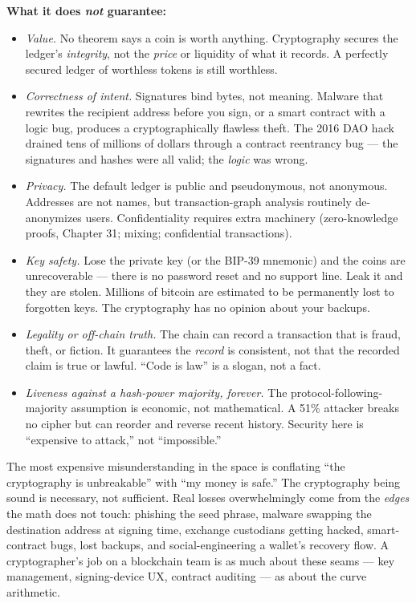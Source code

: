 \textbf{What it does \emph{not} guarantee:}

\begin{itemize}
  \item \emph{Value.} No theorem says a coin is worth anything. Cryptography secures the ledger's \emph{integrity}, not the \emph{price} or liquidity of what it records. A perfectly secured ledger of worthless tokens is still worthless.
  \item \emph{Correctness of intent.} Signatures bind bytes, not meaning. Malware that rewrites the recipient address before you sign, or a smart contract with a logic bug, produces a cryptographically flawless theft. The 2016 DAO hack drained tens of millions of dollars through a contract reentrancy bug --- the signatures and hashes were all valid; the \emph{logic} was wrong.
  \item \emph{Privacy.} The default ledger is public and pseudonymous, not anonymous. Addresses are not names, but transaction-graph analysis routinely de-anonymizes users. Confidentiality requires extra machinery (zero-knowledge proofs, Chapter 31; mixing; confidential transactions).
  \item \emph{Key safety.} Lose the private key (or the BIP-39 mnemonic) and the coins are unrecoverable --- there is no password reset and no support line. Leak it and they are stolen. Millions of bitcoin are estimated to be permanently lost to forgotten keys. The cryptography has no opinion about your backups.
  \item \emph{Legality or off-chain truth.} The chain can record a transaction that is fraud, theft, or fiction. It guarantees the \emph{record} is consistent, not that the recorded claim is true or lawful. ``Code is law'' is a slogan, not a fact.
  \item \emph{Liveness against a hash-power majority, forever.} The protocol-following-majority assumption is economic, not mathematical. A 51\% attacker breaks no cipher but can reorder and reverse recent history. Security here is ``expensive to attack,'' not ``impossible.''
\end{itemize}

\begin{trapbox}
The most expensive misunderstanding in the space is conflating ``the cryptography is unbreakable'' with ``my money is safe.'' The cryptography being sound is necessary, not sufficient. Real losses overwhelmingly come from the \emph{edges} the math does not touch: phishing the seed phrase, malware swapping the destination address at signing time, exchange custodians getting hacked, smart-contract bugs, lost backups, and social-engineering a wallet's recovery flow. A cryptographer's job on a blockchain team is as much about these seams --- key management, signing-device UX, contract auditing --- as about the curve arithmetic.
\end{trapbox}


